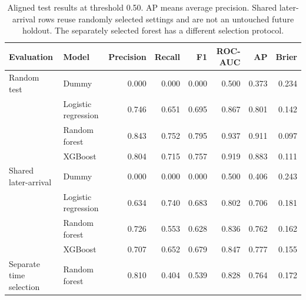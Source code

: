 \begin{table}[t]
\caption{Aligned test results at threshold 0.50. AP means average precision. Shared later-arrival rows reuse randomly selected settings and are not an untouched future holdout. The separately selected forest has a different selection protocol.}
\label{tab:models}
\centering
\begin{tabular}{llrrrrrr}
\toprule
Evaluation & Model & Precision & Recall & F1 & ROC-AUC & AP & Brier\\
\midrule
Random test & Dummy & 0.000 & 0.000 & 0.000 & 0.500 & 0.373 & 0.234\\
 & Logistic regression & 0.746 & 0.651 & 0.695 & 0.867 & 0.801 & 0.142\\
 & Random forest & 0.843 & 0.752 & 0.795 & 0.937 & 0.911 & 0.097\\
 & XGBoost & 0.804 & 0.715 & 0.757 & 0.919 & 0.883 & 0.111\\
\midrule
Shared later-arrival & Dummy & 0.000 & 0.000 & 0.000 & 0.500 & 0.406 & 0.243\\
 & Logistic regression & 0.634 & 0.740 & 0.683 & 0.802 & 0.706 & 0.181\\
 & Random forest & 0.726 & 0.553 & 0.628 & 0.836 & 0.762 & 0.162\\
 & XGBoost & 0.707 & 0.652 & 0.679 & 0.847 & 0.777 & 0.155\\
\midrule
Separate time selection & Random forest & 0.810 & 0.404 & 0.539 & 0.828 & 0.764 & 0.172\\
\bottomrule
\end{tabular}
\end{table}
